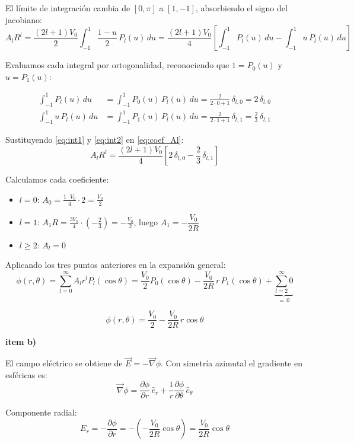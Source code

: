 \documentclass[a4paper]{article}
\begin{document}
El límite de integración cambia de $[0,\pi]$ a $[1,-1]$, absorbiendo el signo del jacobiano:
$$A_l R^l = \frac{(2l+1)V_0}{2}\int_{-1}^{1} \frac{1-u}{2}\,P_l(u)\,du
           = \frac{(2l+1)V_0}{4}
             \left[\int_{-1}^{1} P_l(u)\,du - \int_{-1}^{1} u\,P_l(u)\,du\right]$$

Evaluamos cada integral por ortogonalidad, reconociendo que $1 = P_0(u)$ y $u = P_1(u)$:

\begin{align}
    \int_{-1}^{1} P_l(u)\,du &= \int_{-1}^{1} P_0(u)\,P_l(u)\,du
        = \frac{2}{2\cdot 0+1}\,\delta_{l,0} = 2\,\delta_{l,0}
    \label{eq:int1}\\[4pt]
    \int_{-1}^{1} u\,P_l(u)\,du &= \int_{-1}^{1} P_1(u)\,P_l(u)\,du
        = \frac{2}{2\cdot 1+1}\,\delta_{l,1} = \frac{2}{3}\,\delta_{l,1}
    \label{eq:int2}
\end{align}

Sustituyendo \eqref{eq:int1} y \eqref{eq:int2} en \eqref{eq:coef_Al}:
$$A_l R^l = \frac{(2l+1)V_0}{4}\left[2\,\delta_{l,0} - \frac{2}{3}\,\delta_{l,1}\right]$$

Calculamos cada coeficiente:
\begin{itemize}
    \item $l = 0$: $\displaystyle A_0 = \frac{1\cdot V_0}{4}\cdot 2 = \frac{V_0}{2}$
    \item $l = 1$: $\displaystyle A_1 R = \frac{3V_0}{4}\cdot\left(-\frac{2}{3}\right) = -\frac{V_0}{2}$,
          luego $A_1 = -\dfrac{V_0}{2R}$
    \item $l \ge 2$: $A_l = 0$
\end{itemize}

Aplicando los tres puntos anteriores en la expansión general:
$$\phi(r,\theta) = \sum_{l=0}^{\infty} A_l r^l P_l(\cos\theta)
= \frac{V_0}{2}P_0(\cos\theta) - \frac{V_0}{2R}\,r\,P_1(\cos\theta)
+ \underbrace{\sum_{l=2}^{\infty} 0}_{=\,0}$$

\begin{tcolorbox}
$$\phi(r,\theta) = \frac{V_0}{2} - \frac{V_0}{2R}\,r\cos\theta$$
\end{tcolorbox}

\textbf{item b)}

El campo eléctrico se obtiene de $\vec{E} = -\vec{\nabla}\phi$.
Con simetría azimutal el gradiente en esféricas es:
$$\vec{\nabla}\phi = \frac{\partial\phi}{\partial r}\,\hat{e}_r
                  + \frac{1}{r}\frac{\partial\phi}{\partial\theta}\,\hat{e}_\theta$$

Componente radial:
$$E_r = -\frac{\partial\phi}{\partial r} = -\!\left(-\frac{V_0}{2R}\cos\theta\right)
      = \frac{V_0}{2R}\cos\theta$$
\end{document}
